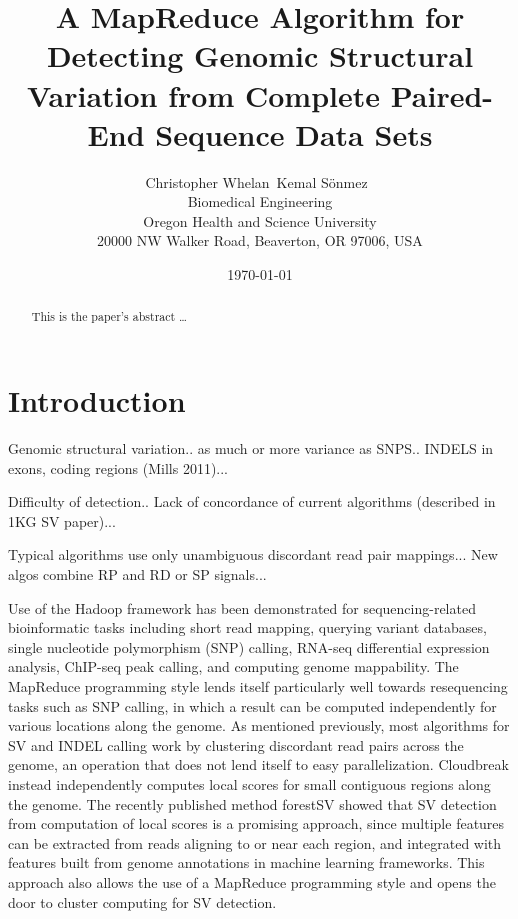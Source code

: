 \documentclass[12pt]{article}
\begin{document}
\title{A MapReduce Algorithm for Detecting Genomic Structural Variation from Complete Paired-End Sequence Data Sets}

\author{
Christopher Whelan\ Kemal S\"onmez\ \\
Biomedical Engineering \\
Oregon Health and Science University \\
20000 NW Walker Road, Beaverton, OR 97006, USA
}

\date{\today}

\maketitle

\begin{abstract}
This is the paper's abstract \ldots
\end{abstract}

\section{Introduction}

Genomic structural variation.. as much or more variance as SNPS.. INDELS in exons, coding regions (Mills 2011)... 

Difficulty of detection.. Lack of concordance of current algorithms (described in 1KG SV paper)...

Typical algorithms use only unambiguous discordant read pair mappings... New algos combine RP and RD or SP signals... 

Use of the Hadoop framework has been demonstrated for sequencing-related bioinformatic tasks including short read mapping, \cite{Schatz:2009p278} querying variant databases, \cite{Oconnor:2010p1835} single nucleotide polymorphism (SNP) calling, \cite{Langmead:2009p1225} RNA-seq differential expression analysis, \cite{Langmead:2010p1268} ChIP-seq peak calling, \cite{Feng:2011p1228} and computing genome mappability. \cite{Lee:2012bk} The MapReduce programming style lends itself particularly well towards resequencing tasks such as SNP calling, in which a result can be computed independently for various locations along the genome. As mentioned previously, most algorithms for SV and INDEL calling work by clustering discordant read pairs across the genome, an operation that does not lend itself to easy parallelization. Cloudbreak instead independently computes local scores for small contiguous regions along the genome. The recently published method forestSV \cite{Michaelson:2012fj} showed that SV detection from computation of local scores is a promising approach, since multiple features can be extracted from reads aligning to or near each region, and integrated with features built from genome annotations in machine learning frameworks. This approach also allows the use of a MapReduce programming style and opens the door to cluster computing for SV detection.
\end{document}
